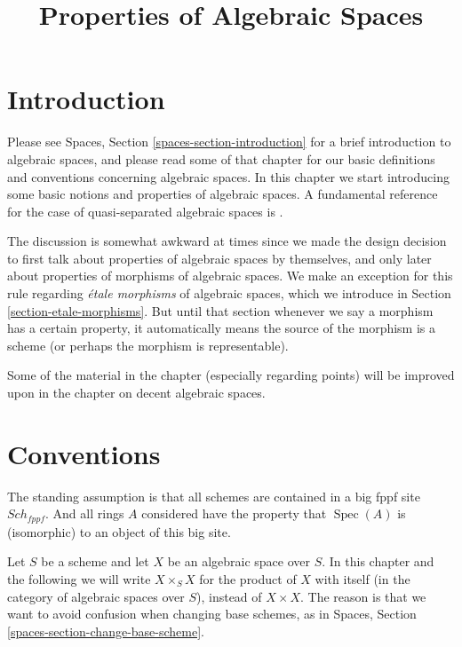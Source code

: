 \documentclass{stacks-project}
\theoremstyle{plain}
\theoremstyle{definition}
\theoremstyle{remark}
\numberwithin{equation}{subsection}
\def\Spec{\mathop{\mathrm{Spec}}}
\def\Sch{\mathit{Sch}}
\begin{document}
\title{Properties of Algebraic Spaces}


\maketitle

\label{section-phantom}

\tableofcontents

\section{Introduction}
\label{section-introduction}

\noindent
Please see
Spaces, Section \ref{spaces-section-introduction}
for a brief introduction to algebraic spaces, and please read
some of that chapter for our basic definitions and conventions
concerning algebraic spaces. In this chapter we start introducing
some basic notions and properties of algebraic spaces. A fundamental
reference for the case of quasi-separated algebraic spaces is
\cite{Kn}.

\medskip\noindent
The discussion is somewhat awkward at times since we made the design
decision to first talk about properties of algebraic spaces by
themselves, and only later about properties of morphisms of algebraic
spaces. We make an exception for this rule regarding
{\it \'etale morphisms} of algebraic spaces, which we introduce in
Section \ref{section-etale-morphisms}.
But until that section whenever we say a morphism has a certain property, it
automatically means the source of the morphism is a scheme (or perhaps the
morphism is representable).

\medskip\noindent
Some of the material in the chapter (especially regarding points)
will be improved upon in the chapter on decent algebraic spaces.


\section{Conventions}
\label{section-conventions}

\noindent
The standing assumption is that all schemes are contained in
a big fppf site $\Sch_{fppf}$. And all rings $A$ considered
have the property that $\Spec(A)$ is (isomorphic) to an
object of this big site.

\medskip\noindent
Let $S$ be a scheme and let $X$ be an algebraic space over $S$.
In this chapter and the following we will write $X \times_S X$
for the product of $X$ with itself (in the category of algebraic
spaces over $S$), instead of $X \times X$. The reason is that we
want to avoid confusion when changing base schemes, as in
Spaces, Section \ref{spaces-section-change-base-scheme}.
\end{document}
